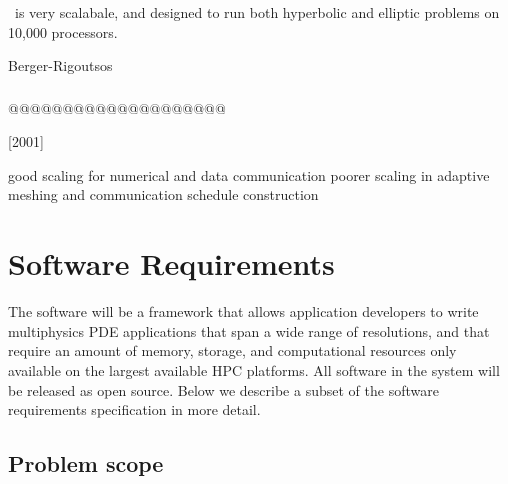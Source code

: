 \documentclass{article}
\begin{document}
\chombo\ is very scalabale, and designed to run both hyperbolic and
elliptic problems on 10,000 processors.

Berger-Rigoutsos 



\subsubsection{} \label{sss:samrai}

@@@@@@@@@@@@@@@@@@@@

[2001]

good scaling for numerical and data communication
poorer scaling in adaptive meshing and communication schedule construction 

\subsubsection{\gadget } \label{sss:chombo}


\newpage
\section{Software Requirements} \label{s:requirements}


The software will be a framework that allows application developers to
write multiphysics PDE applications that span a wide range of resolutions,
and that require an amount of memory, storage, and computational
resources only available on the largest available HPC platforms.  All
software in the system will be released as open source.  Below we
describe a subset of the software requirements specification in more
detail.

\subsection{Problem scope}
\end{document}
